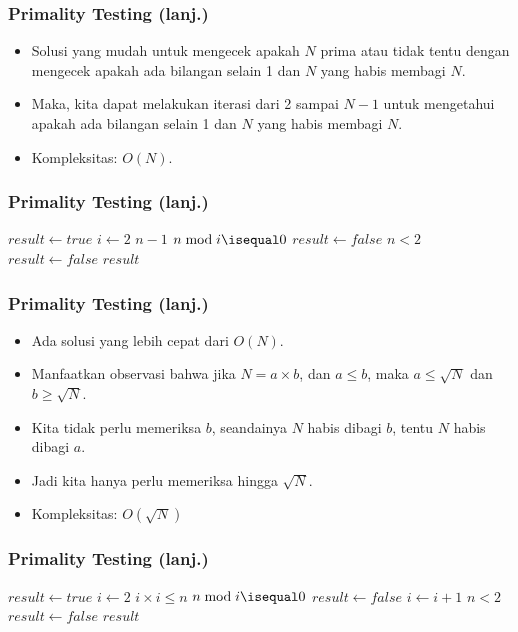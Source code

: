 \begin{frame}
\frametitle{Primality Testing (lanj.)}
\begin{itemize}
  \item Solusi yang mudah untuk mengecek apakah $N$ prima atau tidak tentu dengan mengecek apakah ada bilangan selain 1 dan $N$ yang habis membagi $N$.
  \item Maka, kita dapat melakukan iterasi dari 2 sampai $N-1$ untuk mengetahui apakah ada bilangan selain 1 dan $N$ yang habis membagi $N$.
  \item Kompleksitas: $O(N)$.
\end{itemize}
\end{frame}

\begin{frame}
\frametitle{Primality Testing (lanj.)}

\begin{codebox}
\li $result \gets true$
\li \For $i \gets 2$ \To $n-1$
    \Do
\li   \If $n \bmod i \isequal 0$
      \Then
\li     $result \gets false$
      \End    
    \End
\zi
\li \If $n < 2$
    \Then
\li   $result \gets false$
    \End
\zi
\li \Return $result$    
\end{codebox}
\end{frame}

\begin{frame}
\frametitle{Primality Testing (lanj.)}
\begin{itemize}
  \item Ada solusi yang lebih cepat dari $O(N)$.
  \item Manfaatkan observasi bahwa jika $N = a \times b$, dan $a \leq b$, maka $a \leq \sqrt{N}$ dan $b \geq \sqrt{N}$.
  \item Kita tidak perlu memeriksa $b$, seandainya $N$ habis dibagi $b$, tentu $N$ habis dibagi $a$.
  \item Jadi kita hanya perlu memeriksa hingga $\sqrt{N}$.
  \item Kompleksitas: $O(\sqrt{N})$
\end{itemize}
\end{frame}

\begin{frame}
\frametitle{Primality Testing (lanj.)}
\begin{codebox}
\li $result \gets true$
\li $i \gets 2$
\li \While $i \times i \leq n$
    \Do
\li   \If $n \bmod i \isequal 0$
      \Then
\li     $result \gets false$
      \End
\li   $i \gets i + 1$          
    \End
\zi
\li \If $n < 2$
    \Then
\li   $result \gets false$
    \End
\zi
\li \Return $result$    
\end{codebox}
\end{frame}

